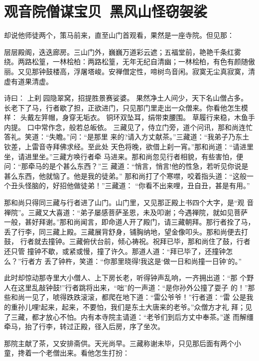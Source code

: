 \chapter{观音院僧谋宝贝~黑风山怪窃袈裟}

却说他师徒两个，策马前来，直至山门首观看，果然是一座寺院。但见那：

层层殿阁，迭迭廊房。三山门外，巍巍万道彩云遮；五福堂前，艳艳千条红雾
绕。两路松篁，一林桧柏：两路松篁，无年无纪自清幽；一林桧柏，有色有颜随傲
丽。又见那钟鼓楼高，浮屠塔峻。安禅僧定性，啼树鸟音闲。寂寞无尘真寂寞，清
虚有道果清虚。

诗曰：
上刹园隐翠窝，招提胜景赛娑婆。
果然净土人间少，天下名山僧占多。
长老下了马，行者歇了担，正欲进门，只见那门里走出一众僧来。你看他怎生模样：
头戴左笄帽，身穿无垢衣。
铜环双坠耳，绢带束腰围。
草履行来稳，木鱼手内提。
口中常作念，般若总皈依。
三藏见了，侍立门旁，道个问讯，那和尚连忙答礼。笑道：“失瞻。”问：“是那里
来的?请入方丈献茶。”三藏道：“我弟子乃东土钦差，上雷音寺拜佛求经。至此处
天色将晚，欲借上刹一宵。”那和尚道：“请进里坐，请进里坐。”三藏方唤行者牵
马进来。那和尚忽见行者相貌，有些害怕，便问：“那牵马的是个甚么东西？”三
藏道：“悄言，悄言!他的性急，若听见你说是甚么东西，他就恼了。他是我的徒弟。”
那和尚打了个寒噤，咬着指头道：“这般一个丑头怪脑的，好招他做徒弟！”三藏道：
“你看不出来哩，丑自丑，甚是有用。”

那和尚只得同三藏与行者进了山门。山门里，又见那正殿上书四个大字，是“观
音禅院”。三藏又大喜道：“弟子屡感菩萨圣恩，未及叩谢；今遇禅院，就如见菩萨
一般，甚好拜谢。”那和尚闻言，即命道人开了殿门，请三藏朝拜。那行者拴了马，
丢了行李，同三藏上殿。三藏展背舒身，铺胸纳地，望金像叩头。那和尚便去打鼓，
行者就去撞钟。三藏俯伏台前，倾心祷祝。祝拜已毕，那和尚住了鼓，行者还只管
撞钟不歇，或紧或慢，撞了许久。那道人道：“拜已毕了，还撞钟怎么？”行者方
丢了钟杵，笑道：“你那里晓得!我这是‘做一日和尚撞一日钟’的。”

此时却惊动那寺里大小僧人、上下房长老，听得钟声乱响，一齐拥出道：“那
个野人在这里乱敲钟鼓!”行者跳将出来，“咄”的一声道：“是你孙外公撞了耍子
的！”那些和尚一见了，唬得跌跌滚滚，都爬在地下道：“雷公爷爷！”行者道：“雷
公是我的重孙儿哩!起来，起来，不要怕，我们是东土大唐来的老爷。”众僧方才礼
拜；见了三藏，都才放心不怕。内有本寺院主请道：“老爷们到后方丈中奉茶。”遂
而解缰牵马，抬了行李，转过正殿，径入后房，序了坐次。

那院主献了茶，又安排斋供。天光尚早。三藏称谢未毕，只见那后面有两个小
童，搀着一个老僧出来。看他怎生打扮：

